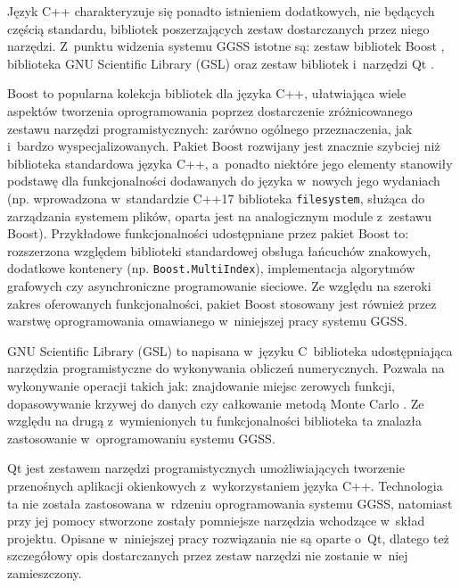 

\clearpage
Język C++ charakteryzuje się ponadto istnieniem dodatkowych, nie będących częścią standardu, bibliotek poszerzających zestaw dostarczanych przez niego narzędzi. Z~punktu widzenia systemu GGSS istotne są: zestaw bibliotek Boost \cite{Boost_main} \cite{Boost_docs}, biblioteka GNU Scientific Library (GSL) \cite{GSL_main} oraz zestaw bibliotek i~narzędzi Qt \cite{Qt_main}.

Boost to popularna kolekcja bibliotek dla języka C++, ułatwiająca wiele aspektów tworzenia oprogramowania poprzez dostarczenie zróżnicowanego zestawu narzędzi programistycznych: zarówno ogólnego przeznaczenia, jak i~bardzo wyspecjalizowanych. Pakiet Boost rozwijany jest znacznie szybciej niż biblioteka standardowa języka C++, a~ponadto niektóre jego elementy stanowiły podstawę dla funkcjonalności dodawanych do języka w~nowych jego wydaniach (np. wprowadzona w~standardzie C++17 biblioteka \lstinline{filesystem}, służąca do zarządzania systemem plików, oparta jest na analogicznym module z~zestawu Boost). Przykładowe funkcjonalności udostępniane przez pakiet Boost to: rozszerzona względem biblioteki standardowej obsługa łańcuchów znakowych, dodatkowe kontenery (np. \lstinline{Boost.MultiIndex}), implementacja algorytmów grafowych czy asynchroniczne programowanie sieciowe. Ze względu na szeroki zakres oferowanych funkcjonalności, pakiet Boost stosowany jest również przez warstwę oprogramowania omawianego w~niniejszej pracy systemu GGSS.

GNU Scientific Library (GSL) to napisana w~języku C~biblioteka udostępniająca narzędzia programistyczne do wykonywania obliczeń numerycznych. Pozwala na wykonywanie operacji takich jak: znajdowanie miejsc zerowych funkcji, dopasowywanie krzywej do danych czy całkowanie metodą Monte Carlo \cite{MC_wikipedia}. Ze względu na drugą z~wymienionych tu funkcjonalności biblioteka ta znalazła zastosowanie w~oprogramowaniu systemu GGSS.

Qt jest zestawem narzędzi programistycznych umożliwiających tworzenie przenośnych aplikacji okienkowych z~wykorzystaniem języka C++. Technologia ta nie została zastosowana w~rdzeniu oprogramowania systemu GGSS, natomiast przy jej pomocy stworzone zostały pomniejsze narzędzia wchodzące w~skład projektu. Opisane w~niniejszej pracy rozwiązania nie są oparte o~Qt, dlatego też szczegółowy opis dostarczanych przez zestaw narzędzi nie zostanie w~niej zamieszczony.


